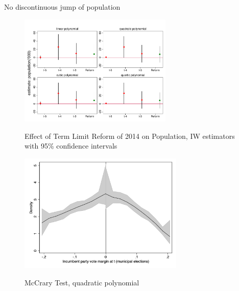 \documentclass{beamer}
\begin{document}
\begin{frame}[label=population, noframenumbering]{No discontinuous jump of population}
\begin{figure}[h] 
\centering 
\caption{Effect of Term Limit Reform of 2014 on Population, IW estimators with 95\% confidence intervals}
\label{fig:incumbency_adv_1234}
\includegraphics[width=0.65\textwidth]{Figures_pres/pop.pdf}
       \captionsetup{justification=centering}

  \hyperlink{mechanism_identification}{} 

\end{figure} 
\end{frame}
\begin{frame}[label=mccrary_test, noframenumbering]
 
\begin{figure}[H]
\centering
\caption{McCrary Test, quadratic polynomial}
  \label{fig:mccrary}
 
 \includegraphics[width=0.7\textwidth]{Figures_pres/mccrary_test_pol2.png}
       \captionsetup{justification=centering}
  
  \hyperlink{mechanism_identification}{}
\end{figure} 
      
\end{frame}
\end{document}
